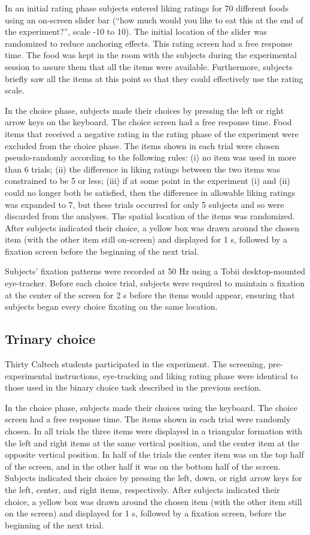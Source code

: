 In an initial rating phase subjects entered liking ratings for 70 different foods using an on-screen slider bar (“how much would you like to eat this at the end of the experiment?”, scale -10 to 10). The initial location of the slider was randomized to reduce anchoring effects. This rating screen had a free response time. The food was kept in the room with the subjects during the experimental session to assure them that all the items were available. Furthermore, subjects briefly saw all the items at this point so that they could effectively use the rating scale.

In the choice phase, subjects made their choices by pressing the left or right arrow keys on the keyboard. The choice screen had a free response time. Food items that received a negative rating in the rating phase of the experiment were excluded from the choice phase. The items shown in each trial were chosen pseudo-randomly according to the following rules: (i) no item was used in more than 6 trials; (ii) the difference in liking ratings between the two items was constrained to be 5 or less; (iii) if at some point in the experiment (i) and (ii) could no longer both be satisfied, then the difference in allowable liking ratings was expanded to 7, but these trials occurred for only 5 subjects and so were discarded from the analyses. The spatial location of the items was randomized. After subjects indicated their choice, a yellow box was drawn around the chosen item (with the other item still on-screen) and displayed for 1 s, followed by a fixation screen before the beginning of the next trial.

Subjects’ fixation patterns were recorded at 50 Hz using a Tobii desktop-mounted eye-tracker. Before each choice trial, subjects were required to maintain a fixation at the center of the screen for 2 s before the items would appear, ensuring that subjects began every choice fixating on the same location.


\subsection{Trinary choice}

Thirty Caltech students participated in the experiment. The screening, pre-experimental instructions, eye-tracking and liking rating phase were identical to those used in the binary choice task described in the previous section.

In the choice phase, subjects made their choices using the keyboard. The choice screen had a free response time. The items shown in each trial were randomly chosen. In all trials the three items were displayed in a triangular formation with the left and right items at the same vertical position, and the center item at the opposite vertical position. In half of the trials the center item was on the top half of the screen, and in the other half it was on the bottom half of the screen. Subjects indicated their choice by pressing the left, down, or right arrow keys for the left, center, and right items, respectively. After subjects indicated their choice, a yellow box was drawn around the chosen item (with the other item still on the screen) and displayed for 1 s, followed by a fixation screen, before the beginning of the next trial.


